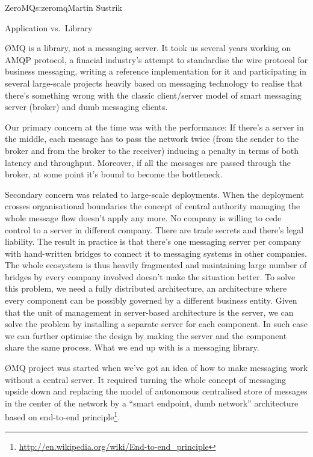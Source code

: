 \begin{aosachapter}{ZeroMQ}{s:zeromq}{Martin Sustrik}
\begin{aosasect1}{Application vs.\ Library}

ØMQ is a library, not a messaging server. It took us several years
working on AMQP protocol, a finacial industry's attempt to standardise
the wire protocol for business messaging, writing a reference
implementation for it and participating in several large-scale
projects heavily based on messaging technology to realise that there's
something wrong with the classic client/server model of smart
messaging server (broker) and dumb messaging clients.

Our primary concern at the time was with the performance: If there's a
server in the middle, each message has to pass the network twice (from
the sender to the broker and from the broker to the receiver) inducing
a penalty in terms of both latency and throughput. Moreover, if all
the messages are passed through the broker, at some point it's bound
to become the bottleneck.

Secondary concern was related to large-scale deployments. When the
deployment crosses organisational boundaries the concept of central
authority managing the whole message flow doesn't apply any more. No
company is willing to cede control to a server in different
company. There are trade secrets and there's legal liability. The
result in practice is that there's one messaging server per company
with hand-written bridges to connect it to messaging systems in other
companies. The whole ecosystem is thus heavily fragmented and
maintaining large number of bridges by every company involved doesn't
make the situation better. To solve this problem, we need a fully
distributed architecture, an architecture where every component can be
possibly governed by a different business entity. Given that the unit
of management in server-based architecture is the server, we can solve
the problem by installing a separate server for each component. In
such case we can further optimise the design by making the server and
the component share the same process. What we end up with is a
messaging library.

ØMQ project was started when we've got an idea of how to make
messaging work without a central server. It required turning the whole
concept of messaging upside down and replacing the model of autonomous
centralised store of messages in the center of the network by a
``smart endpoint, dumb network'' architecture based on end-to-end
principle\footnote{\url{http://en.wikipedia.org/wiki/End-to-end_principle}}.


\end{aosasect1}
\end{aosachapter}

